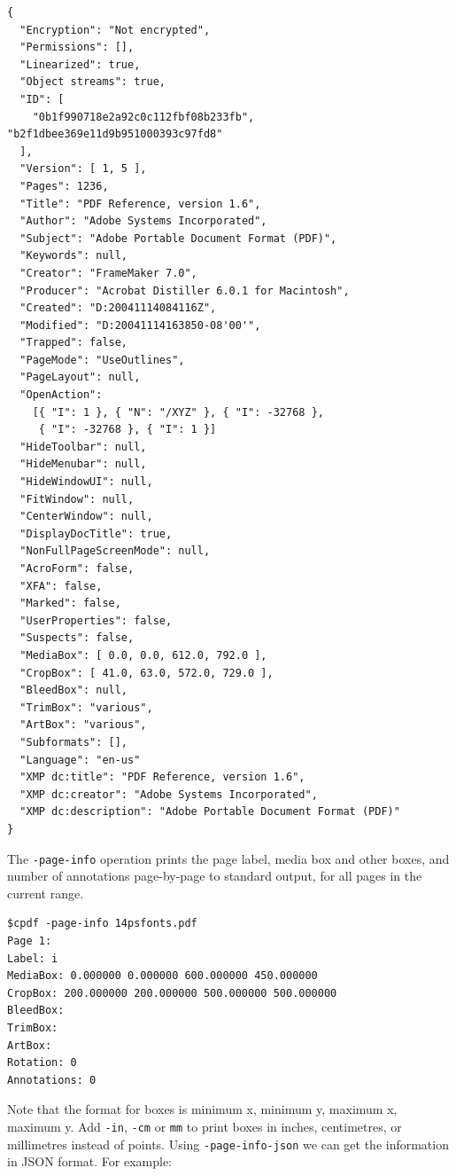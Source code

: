 \documentclass{book}
\begin{document}
\begin{framed}
{\small\begin{verbatim}
{
  "Encryption": "Not encrypted",
  "Permissions": [],
  "Linearized": true,
  "Object streams": true,
  "ID": [
    "0b1f990718e2a92c0c112fbf08b233fb", "b2f1dbee369e11d9b951000393c97fd8"
  ],
  "Version": [ 1, 5 ],
  "Pages": 1236,
  "Title": "PDF Reference, version 1.6",
  "Author": "Adobe Systems Incorporated",
  "Subject": "Adobe Portable Document Format (PDF)",
  "Keywords": null,
  "Creator": "FrameMaker 7.0",
  "Producer": "Acrobat Distiller 6.0.1 for Macintosh",
  "Created": "D:20041114084116Z",
  "Modified": "D:20041114163850-08'00'",
  "Trapped": false,
  "PageMode": "UseOutlines",
  "PageLayout": null,
  "OpenAction":
    [{ "I": 1 }, { "N": "/XYZ" }, { "I": -32768 },
     { "I": -32768 }, { "I": 1 }]
  "HideToolbar": null,
  "HideMenubar": null,
  "HideWindowUI": null,
  "FitWindow": null,
  "CenterWindow": null,
  "DisplayDocTitle": true,
  "NonFullPageScreenMode": null,
  "AcroForm": false,
  "XFA": false,
  "Marked": false,
  "UserProperties": false,
  "Suspects": false,
  "MediaBox": [ 0.0, 0.0, 612.0, 792.0 ],
  "CropBox": [ 41.0, 63.0, 572.0, 729.0 ],
  "BleedBox": null,
  "TrimBox": "various",
  "ArtBox": "various",
  "Subformats": [],
  "Language": "en-us"
  "XMP dc:title": "PDF Reference, version 1.6",
  "XMP dc:creator": "Adobe Systems Incorporated",
  "XMP dc:description": "Adobe Portable Document Format (PDF)"
}
\end{verbatim}}\end{framed}

\noindent The \texttt{-page-info} operation prints the page label, media box and other boxes, and number of annotations page-by-page to standard output, for all pages in the current range.

\begin{framed}
{\small\begin{verbatim}
$cpdf -page-info 14psfonts.pdf
Page 1:
Label: i
MediaBox: 0.000000 0.000000 600.000000 450.000000
CropBox: 200.000000 200.000000 500.000000 500.000000
BleedBox: 
TrimBox: 
ArtBox:
Rotation: 0
Annotations: 0
\end{verbatim}}
\end{framed}

\noindent Note that the format for boxes is minimum x, minimum y, maximum x, maximum y. Add \texttt{-in}, \texttt{-cm} or \texttt{mm} to print boxes in inches, centimetres, or millimetres instead of points. Using \texttt{-page-info-json} we can get the information in JSON format. For example:
\end{document}
